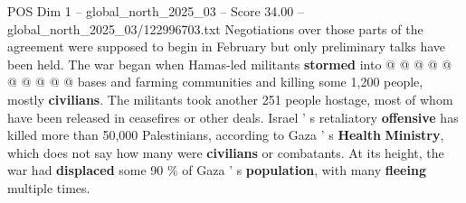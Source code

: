 \begin{textsample}{POS Dim 1 – global\_north\_2025\_03 – Score 34.00 – global\_north\_2025\_03/122996703.txt}
Negotiations over those parts of the agreement were supposed to begin in February but only preliminary talks have been held.
The war began when Hamas-led militants \textbf{stormed} into @ @ @ @ @ @ @ @ @ @ bases and farming communities and killing some 1,200 people, mostly \textbf{civilians}.
The militants took another 251 people hostage, most of whom have been released in ceasefires or other deals.
Israel ' s retaliatory \textbf{offensive} has killed more than 50,000 Palestinians, according to Gaza ' s \textbf{Health} \textbf{Ministry}, which does not say how many were \textbf{civilians} or combatants.
At its height, the war had \textbf{displaced} some 90 \% of Gaza ' s \textbf{population}, with many \textbf{fleeing} multiple times.

\end{textsample}
